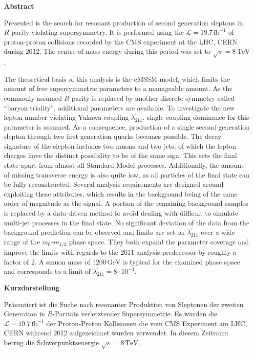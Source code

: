 \documentclass[11pt,a4paper,twoside,openright,DIV=13,BCOR=1cm]{scrbook} %
\numberwithin{equation}{chapter} %
\numberwithin{figure}{chapter} %
\numberwithin{table}{chapter} %
\begin{document}

\newpage

\begin{center} \textbf{Abstract} \end{center}
\noindent Presented is the search for resonant production of second generation sleptons in $R$-parity violating supersymmetry. It is performed using the $\mathcal{L} = 19.7\,\text{fb}^{-1}$ of proton-proton collisions recorded by the CMS experiment at the LHC, CERN during 2012. The centre-of-mass energy during this period was set to $\sqrt{s} = 8\,\text{TeV}$.

The theoretical basis of this analysis is the cMSSM model, which limits the amount of free supersymmetric parameters to a manageable amount. As the commonly assumed $R$-parity is replaced by another discrete symmetry called ``baryon triality'', additional parameters are available. To investigate the new lepton number violating Yukawa coupling $\lambda^\prime_{211}$, single coupling dominance for this parameter is assumed. As a consequence, production of a single second generation slepton through two first generation quarks becomes possible. The decay signature of the slepton includes two muons and two jets, of which the lepton charges have the distinct possibility to be of the same sign. This sets the final state apart from almost all Standard Model processes. Additionally, the amount of missing transverse energy is also quite low, as all particles of the final state can be fully reconstructed. Several analysis requirements are designed around exploiting these attributes, which results in the background being of the same order of magnitude as the signal. A portion of the remaining background samples is replaced by a data-driven method to avoid dealing with difficult to simulate multi-jet processes in the final state. No significant deviation of the data from the background prediction can be observed and limits are set on $\lambda^\prime_{211}$ over a wide range of the $m_0$-$m_{1/2}$ phase space. They both expand the parameter coverage and improve the limits with regards to the 2011 analysis predecessor by roughly a factor of 2. A smuon mass of $1200\,\text{GeV}$ is typical for the examined phase space and corresponds to a limit of $\lambda^\prime_{211} = 8 \cdot 10^{-3}$.


\newpage
\begin{center} \textbf{Kurzdarstellung} \end{center}
\noindent Präsentiert ist die Suche nach resonanter Produktion von Sleptonen der zweiten Generation in $R$-Paritäts verletztender Supersymmetrie. Es wurden die $\mathcal{L} = 19.7\,\text{fb}^{-1}$ der Proton-Proton Kollisionen die vom CMS Experiment am LHC, CERN während 2012 aufgezeichnet wurden verwendet. In diesem Zeitraum betrug die Schwerpunktsenergie $\sqrt{s} = 8\,\text{TeV}$.
\end{document}
